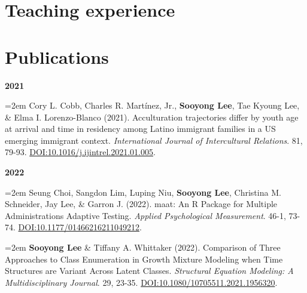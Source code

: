 \documentclass[11pt,a4paper,]{awesome-me}
\begin{document}
\hypertarget{teaching-experience}{%
\section{Teaching experience}\label{teaching-experience}}

\begin{cventries}

\end{cventries}

\hypertarget{publications}{%
\section{Publications}\label{publications}}

\setlength{\leftskip}{0cm}

\textbf{2021}

\setlength{\leftskip}{0.5cm}

\hangindent=2em  Cory L. Cobb, Charles R. Martínez, Jr.,
\textbf{Sooyong Lee}, Tae Kyoung Lee, \& Elma I. Lorenzo-Blanco (2021).
Acculturation trajectories differ by youth age at arrival and time in
residency among Latino immigrant families in a US emerging immigrant
context. \emph{International Journal of Intercultural Relations}. 81,
79-93. \url{DOI:10.1016/j.ijintrel.2021.01.005}.

\setlength{\leftskip}{0cm}

\textbf{2022}

\setlength{\leftskip}{0.5cm}

\hangindent=2em  Seung Choi, Sangdon Lim, Luping Niu,
\textbf{Sooyong Lee}, Christina M. Schneider, Jay Lee, \& Garron J.
(2022). maat: An R Package for Multiple Administrations Adaptive
Testing. \emph{Applied Psychological Measurement}. 46-1, 73-74.
\url{DOI:10.1177/01466216211049212}.

\hangindent=2em  \textbf{Sooyong Lee} \& Tiffany A.
Whittaker (2022). Comparison of Three Approaches to Class Enumeration in
Growth Mixture Modeling when Time Structures are Variant Across Latent
Classes. \emph{Structural Equation Modeling: A Multidisciplinary
Journal}. 29, 23-35. \url{DOI:10.1080/10705511.2021.1956320}.
\end{document}
